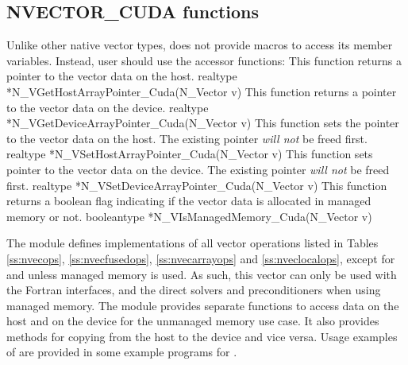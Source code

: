 \subsection{NVECTOR\_CUDA functions}
\label{ss:nvec_cuda_functions}

Unlike other native {\sundials} vector types, {\nveccuda} does not provide macros
to access its member variables. Instead, user should use the accessor functions:
{
  This function returns a pointer to the vector data on the host.
}
{
  realtype *N\_VGetHostArrayPointer\_Cuda(N\_Vector v)
}
{
  This function returns a pointer to the vector data on the device.
}
{
  realtype *N\_VGetDeviceArrayPointer\_Cuda(N\_Vector v)
}
{
  This function sets the pointer to the vector data on the host.
  The existing pointer \textit{will not} be freed first.
}
{
  realtype *N\_VSetHostArrayPointer\_Cuda(N\_Vector v)
}
{
  This function sets pointer to the vector data on the device.
  The existing pointer \textit{will not} be freed first.
}
{
  realtype *N\_VSetDeviceArrayPointer\_Cuda(N\_Vector v)
}
{
  This function returns a boolean flag indicating if the vector
  data is allocated in managed memory or not.
}
{
  booleantype *N\_VIsManagedMemory\_Cuda(N\_Vector v)
}

The {\nveccuda} module defines implementations of all vector operations listed
in Tables \ref{ss:nvecops}, \ref{ss:nvecfusedops}, \ref{ss:nvecarrayops}
and \ref{ss:nveclocalops}, except for  and
 unless managed memory is used.
As such, this vector can only be used with the {\sundials} Fortran interfaces,
and the {\sundials} direct solvers and preconditioners when using managed memory.
The {\nveccuda} module provides separate functions to access data on the host
and on the device for the unmanaged memory use case. It also provides methods
for copying from the host to the device and vice versa. Usage examples of
{\nveccuda} are provided in some example programs for {\cvode} \cite{cvode_ex}.

